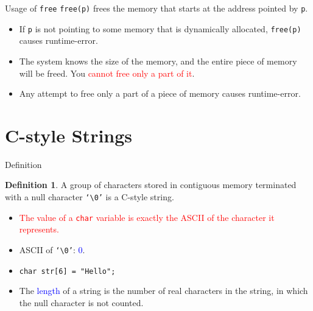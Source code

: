 \documentclass{beamer}
\newcommand{\red}[1]{\textcolor{red}{#1}}
\newcommand{\blue}[1]{\textcolor{blue}{#1}}
\newcommand{\ttt}[1]{\texttt{#1}}
\theoremstyle{definition}
\newtheorem{dfn}{Definition}
\begin{document}
\begin{frame}[fragile]{Usage of \ttt{free}}
    \ttt{free(p)} frees the memory that starts at the address pointed by \ttt{p}.
    \begin{itemize}
        \item If \ttt{p} is not pointing to some memory that is dynamically allocated, \ttt{free(p)} causes runtime-error.
        \item The system knows the size of the memory, and the entire piece of memory will be freed. You \red{cannot free only a part of it}.
        \item Any attempt to free only a part of a piece of memory causes runtime-error.
    \end{itemize}
\end{frame}

\section{C-style Strings}

\begin{frame}{Definition}
    \begin{dfn}
        A group of characters stored in contiguous memory terminated with a null character \ttt{`\textbackslash 0'} is a C-style string.
    \end{dfn}
    \pause
    \begin{itemize}
        \item \red{The value of a \ttt{char} variable is exactly the ASCII of the character it represents.}
        \item ASCII of \ttt{`\textbackslash 0'}: \blue{0}.
        \item \ttt{char str[6] = "Hello";}
        \item The \blue{length} of a string is the number of real characters in the string, in which the null character is not counted.
    \end{itemize}
\end{frame}
\end{document}
